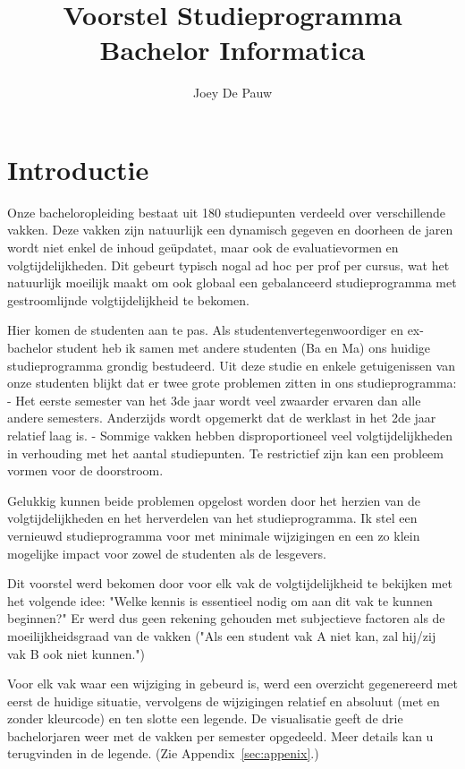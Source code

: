 \documentclass[a4paper]{article}
\title{Voorstel Studieprogramma Bachelor Informatica}
\author{Joey De Pauw}
\date{}
\begin{document}
    \maketitle

    \section{Introductie}

        Onze bacheloropleiding bestaat uit 180 studiepunten verdeeld over verschillende vakken. Deze vakken zijn natuurlijk een dynamisch gegeven en doorheen de jaren wordt niet enkel de inhoud ge\"updatet, maar ook de evaluatievormen en volgtijdelijkheden. Dit gebeurt typisch nogal ad hoc per prof per cursus, wat het natuurlijk moeilijk maakt om ook globaal een gebalanceerd studieprogramma met gestroomlijnde volgtijdelijkheid te bekomen.

        Hier komen de studenten aan te pas. Als studentenvertegenwoordiger en ex-bachelor student heb ik samen met andere studenten (Ba en Ma) ons huidige studieprogramma grondig bestudeerd. Uit deze studie en enkele getuigenissen van onze studenten blijkt dat er twee grote problemen zitten in ons studieprogramma:
            - Het eerste semester van het 3de jaar wordt veel zwaarder ervaren dan alle andere semesters. Anderzijds wordt opgemerkt dat de werklast in het 2de jaar relatief laag is.
            - Sommige vakken hebben disproportioneel veel volgtijdelijkheden in verhouding met het aantal studiepunten. Te restrictief zijn kan een probleem vormen voor de doorstroom.

        Gelukkig kunnen beide problemen opgelost worden door het herzien van de volgtijdelijkheden en het herverdelen van het studieprogramma. Ik stel een vernieuwd studieprogramma voor met minimale wijzigingen en een zo klein mogelijke impact voor zowel de studenten als de lesgevers.

        Dit voorstel werd bekomen door voor elk vak de volgtijdelijkheid te bekijken met het volgende idee: "Welke kennis is essentieel nodig om aan dit vak te kunnen beginnen?" Er werd dus geen rekening gehouden met subjectieve factoren als de moeilijkheidsgraad van de vakken ("Als een student vak A niet kan, zal hij/zij vak B ook niet kunnen.")

        Voor elk vak waar een wijziging in gebeurd is, werd een overzicht gegenereerd met eerst de huidige situatie, vervolgens de wijzigingen relatief en absoluut (met en zonder kleurcode) en ten slotte een legende. De visualisatie geeft de drie bachelorjaren weer met de vakken per semester opgedeeld. Meer details kan u terugvinden in de legende. (Zie Appendix~\ref{sec:appenix}.)
\end{document}

